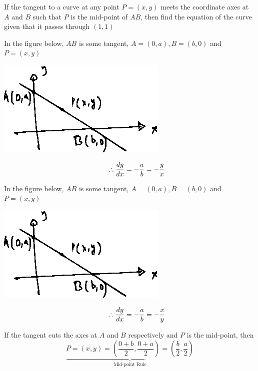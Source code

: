 \documentclass[14pt,fleqn]{extarticle}
\begin{document}
 
\begin{question}
	\statement 
    
    If the tangent to a curve at any point $P = (x,y)$ meets the coordinate
    axes at $A$ and $B$ such that $P$ is the mid-point of $AB$, then find the equation 
    of the curve given that it passes through $(1,1)$
    
    \begin{step}
  \begin{options} 
     \correct 
       
       In the figure below, $AB$ is some tangent, $A = (0,a), B = (b,0)$ and $P=(x,y)$ 
       
       \begin{center}
\includegraphics[scale=1.4]{1417-A.eps}
\end{center}

     \[\qquad \therefore \frac{dy}{dx} = -\frac{a}{b} = -\frac{y}{x} \]
       
     \incorrect
     
     In the figure below, $AB$ is some tangent, $A = (0,a), B = (b,0)$ and $P=(x,y)$ 
       
       \begin{center}
\includegraphics[scale=1.4]{1417-A.eps}
\end{center}

     \[\qquad \therefore \frac{dy}{dx} = -\frac{a}{b} = -\frac{x}{y} \]
        
    \end{options} 
     \reason 
     
     If the tangent cuts the axes at $A$ and $B$ respectively and $P$ 
     is the mid-point, then 
     \[ \underbrace{P = \left(x,y \right) = \left(\frac{0+b}{2},\frac{0+a}{2} \right) = \left(\frac{b}{2}, \frac{a}{2} \right)}_{\text{Mid-point Rule}} \]
       

\end{step}
\end{question}
\end{document}

